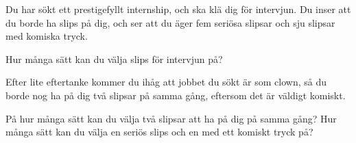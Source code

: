 \documentclass{tufte-handout}
\begin{document}
\begin{xca}
	Du har sökt ett prestigefyllt internship, och ska klä dig för intervjun. Du inser att du borde ha slips på dig, och ser att du äger fem seriösa slipsar och sju slipsar med komiska tryck.
  
	Hur många sätt kan du välja slips för intervjun på?
  
	Efter lite eftertanke kommer du ihåg att jobbet du sökt är som clown, så du borde nog ha på dig två slipsar på samma gång, eftersom det är väldigt komiskt.

	På hur många sätt kan du välja två slipsar att ha på dig på samma gång? Hur många sätt kan du välja en seriös slips och en med ett komiskt tryck på?
  \end{xca}



\end{document}
